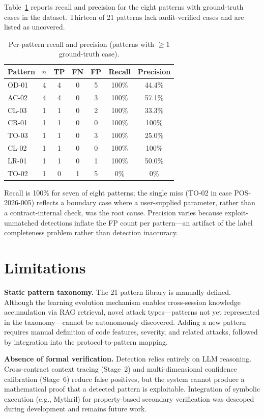 \documentclass[10pt]{article}
\begin{document}
Table~\ref{tab:perpattern} reports recall and precision for the eight patterns with ground-truth cases in the dataset. Thirteen of 21 patterns lack audit-verified cases and are listed as uncovered.

\begin{table}[H]
\centering
\caption{Per-pattern recall and precision (patterns with $\geq 1$ ground-truth case).}
\label{tab:perpattern}
\small
\begin{tabular}{lcccccc}
\toprule
Pattern & $n$ & TP & FN & FP & Recall & Precision \\
\midrule
OD-01 & 4 & 4 & 0 & 5 & 100\% & 44.4\% \\
AC-02 & 4 & 4 & 0 & 3 & 100\% & 57.1\% \\
CL-03 & 1 & 1 & 0 & 2 & 100\% & 33.3\% \\
CR-01 & 1 & 1 & 0 & 0 & 100\% & 100\% \\
TO-03 & 1 & 1 & 0 & 3 & 100\% & 25.0\% \\
CL-02 & 1 & 1 & 0 & 0 & 100\% & 100\% \\
LR-01 & 1 & 1 & 0 & 1 & 100\% & 50.0\% \\
TO-02 & 1 & 0 & 1 & 5 & 0\% & 0\% \\
\bottomrule
\end{tabular}
\end{table}

Recall is 100\% for seven of eight patterns; the single miss (TO-02 in case POS-2026-005) reflects a boundary case where a user-supplied parameter, rather than a contract-internal check, was the root cause. Precision varies because exploit-unmatched detections inflate the FP count per pattern---an artifact of the label completeness problem rather than detection inaccuracy.

\section{Limitations}

\textbf{Static pattern taxonomy.} The 21-pattern library is manually defined. Although the learning evolution mechanism enables cross-session knowledge accumulation via RAG retrieval, novel attack types---patterns not yet represented in the taxonomy---cannot be autonomously discovered. Adding a new pattern requires manual definition of code features, severity, and related attacks, followed by integration into the protocol-to-pattern mapping.

\textbf{Absence of formal verification.} Detection relies entirely on LLM reasoning. Cross-contract context tracing (Stage~2) and multi-dimensional confidence calibration (Stage~6) reduce false positives, but the system cannot produce a mathematical proof that a detected pattern is exploitable. Integration of symbolic execution (e.g., Mythril) for property-based secondary verification was descoped during development and remains future work.
\end{document}
